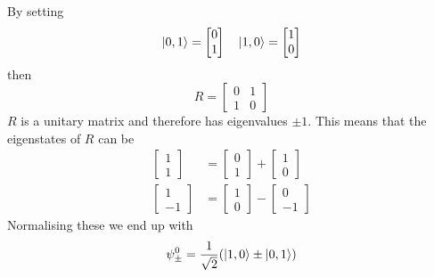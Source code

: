 \documentclass[11pt]{amsart}
\begin{document}
By setting
\begin{equation*}
\ket{0,1} = \begin{bmatrix} 0 \\ 1 \end{bmatrix} \quad \ket{1,0} = \begin{bmatrix} 1 \\ 0 \end{bmatrix}
\end{equation*}
then
\begin{equation*}
R = \begin{bmatrix}
0 & 1 \\
1 & 0 
\end{bmatrix}
\end{equation*}
$R$ is a unitary matrix and therefore has eigenvalues $\pm1$. This means that the eigenstates of $R$ can be
\begin{align*}
\begin{bmatrix} 1 \\ 1 \end{bmatrix} &=  \begin{bmatrix} 0 \\ 1 \end{bmatrix} + \begin{bmatrix} 1 \\ 0 \end{bmatrix} \\
\begin{bmatrix} 1 \\ -1 \end{bmatrix} &=  \begin{bmatrix} 1 \\ 0 \end{bmatrix} - \begin{bmatrix} 0 \\ -1 \end{bmatrix}
\end{align*}
Normalising these we end up with
\begin{equation}
\psi_\pm^0 = \frac{1}{\sqrt{2}}(\ket{1,0} \pm \ket{0,1})
\end{equation}
\end{document}
